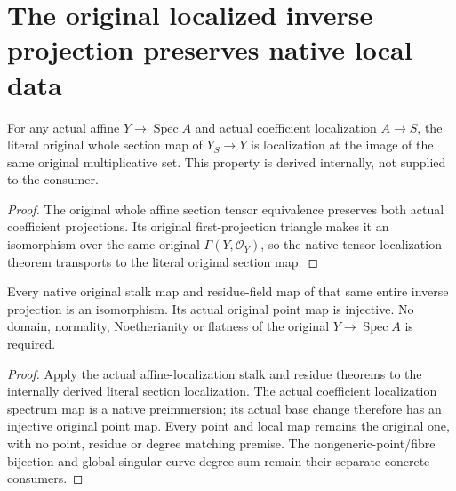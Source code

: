 \section{The original localized inverse projection preserves native local data}

\begin{theorem}
\label{thm:fc-localized-inverse-section-localization}
\leanok
{}
For any actual affine $Y\to\operatorname{Spec}A$ and actual coefficient
localization $A\to S$, the literal original whole section map of
$Y_S\to Y$ is localization at the image of the same original multiplicative
set.  This property is derived internally, not supplied to the consumer.
\end{theorem}
\begin{proof}
The original whole affine section tensor equivalence preserves both actual
coefficient projections.  Its original first-projection triangle makes it
an isomorphism over the same original $\Gamma(Y,\mathcal O_Y)$, so the native
tensor-localization theorem transports to the literal original section map.
\end{proof}

\begin{theorem}
\label{thm:fc-localized-inverse-native-stalks-residues}
\leanok
{}
Every native original stalk map and residue-field map of that same entire
inverse projection is an isomorphism.  Its actual original point map is
injective.  No domain, normality, Noetherianity or flatness of the original
$Y\to\operatorname{Spec}A$ is required.
\end{theorem}
\begin{proof}
Apply the actual affine-localization stalk and residue theorems to the
internally derived literal section localization.  The actual coefficient
localization spectrum map is a native preimmersion; its actual base change
therefore has an injective original point map.  Every point and local map
remains the original one, with no point, residue or degree matching premise.
The nongeneric-point/fibre bijection and global singular-curve degree sum
remain their separate concrete consumers.
\end{proof}

